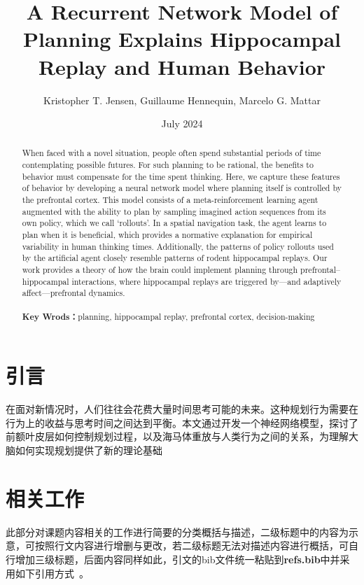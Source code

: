 \documentclass[UTF8,12pt]{article} %
\newcommand*{\kaiti}{\CJKfamily{zhkai}}  %
\begin{document}
\title{\bf{A Recurrent Network Model of Planning Explains Hippocampal Replay and Human Behavior}}
\author{Kristopher T. Jensen, Guillaume Hennequin, Marcelo G. Mattar}
\date{July 2024}
 
\maketitle
\begin{abstract}
	{\kaiti When faced with a novel situation, people often spend substantial periods of time contemplating possible futures. For such planning to be rational, the benefits to behavior must compensate for the time spent thinking. Here, we capture these features of behavior by developing a neural network model where planning itself is controlled by the prefrontal cortex. This model consists of a meta-reinforcement learning agent augmented with the ability to plan by sampling imagined action sequences from its own policy, which we call ‘rollouts’. In a spatial navigation task, the agent learns to plan when it is beneficial, which provides a normative explanation for empirical variability in human thinking times. Additionally, the patterns of policy rollouts used by the artificial agent closely resemble patterns of rodent hippocampal replays. Our work provides a theory of how the brain could implement planning through prefrontal–hippocampal interactions, where hippocampal replays are triggered by—and adaptively affect—prefrontal dynamics.}
 	\\\\
 	\textbf{Key Wrods：}planning, hippocampal replay, prefrontal cortex, decision-making
\end{abstract}

\section{引言}

在面对新情况时，人们往往会花费大量时间思考可能的未来。这种规划行为需要在行为上的收益与思考时间之间达到平衡。本文通过开发一个神经网络模型，探讨了前额叶皮层如何控制规划过程，以及海马体重放与人类行为之间的关系，为理解大脑如何实现规划提供了新的理论基础

\section{相关工作}
	此部分对课题内容相关的工作进行简要的分类概括与描述，二级标题中的内容为示意，可按照行文内容进行增删与更改，若二级标题无法对描述内容进行概括，可自行增加三级标题，后面内容同样如此，引文的bib文件统一粘贴到\textbf{refs.bib}中并采用如下引用方式~\cite{liu_2024_brep}。
\end{document}
